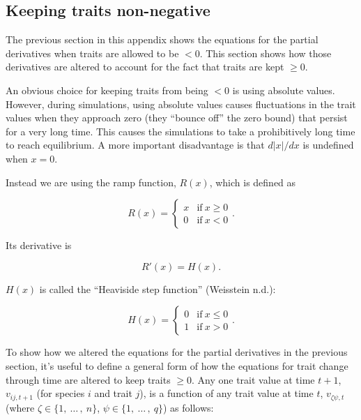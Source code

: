 \subsection*{Keeping traits non-negative}


The previous section in this appendix shows the equations for the
partial derivatives when traits are allowed to be $<0$.
This section shows how those derivatives are altered to account for
the fact that traits are kept $\ge 0$.


An obvious choice for keeping traits from being $<0$ is using absolute
values.
However, during simulations, using absolute values causes fluctuations
in the trait values when they approach zero (they ``bounce off''
the zero bound) that persist for a very long time.
This causes the simulations to take a prohibitively long time to reach
equilibrium.
A more important disadvantage is that $d \lvert x \rvert / dx$ is
undefined when $x = 0$.


Instead we are using the ramp function, $R(x)$, which is defined as

\begin{equation*}
    R(x) = \begin{cases}
        x & \text{if}\ x \ge 0 \\
        0 & \text{if}\ x < 0
        \end{cases}
    \text{.}
\end{equation*}


\noindent Its derivative is

\begin{equation*}
    R'(x) = H(x).
\end{equation*}

\noindent $H(x)$ is called the ``Heaviside step function'' (Weisstein n.d.):

\begin{equation*}
    H(x) = \begin{cases}
        0 & \text{if}\ x \le 0 \\
        1 & \text{if}\ x > 0
        \end{cases}
    \text{.}
\end{equation*}



To show how we altered the equations for the partial derivatives
in the previous section, it's useful to define a general form of how
the equations for trait change through time are altered to keep traits $\ge 0$.
Any one trait value at time $t+1$,
$v_{ij,t+1}$ (for species $i$ and trait $j$),
is a function of any trait value at time $t$, $v_{\zeta\psi,t}$
(where $\zeta \in \{ 1, \: \ldots \, , \: n \}$,
$\psi \in \{ 1, \: \ldots \, , \: q \}$)
as follows:

